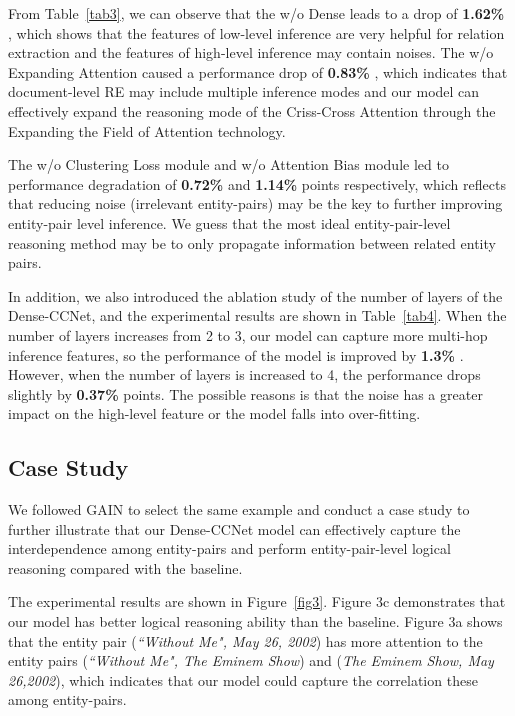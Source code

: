 \documentclass[11pt]{article}
\begin{document}
From Table~\ref{tab3}, we can observe that the w/o Dense leads to a drop of \textbf{1.62\%} , which shows that the features of low-level inference are very helpful for relation extraction and  the features of high-level inference may contain noises. 
The w/o Expanding Attention caused a performance drop of \textbf{0.83\%} , which indicates that document-level RE may include multiple inference modes and our model can effectively expand the reasoning mode of the Criss-Cross Attention through the Expanding the Field of Attention technology.

The w/o Clustering Loss module and w/o Attention Bias module led to performance degradation of \textbf{0.72\%}  and \textbf{1.14\%}  points respectively, which reflects that reducing noise (irrelevant entity-pairs) may be the key to further improving entity-pair level inference. 
We guess that the most ideal entity-pair-level reasoning method may be to only propagate information between related entity pairs.

In addition, we also introduced the ablation study of the number of layers of the Dense-CCNet, and the experimental results are shown in Table~\ref{tab4}.
When the number of layers increases from 2 to 3, our model can capture more multi-hop inference features, so the performance of the model is improved by \textbf{1.3\%} .
However, when the number of layers is increased to 4, the performance drops slightly by \textbf{0.37\%}  points.
The possible reasons is that the noise has a greater impact on the high-level feature or the model falls into over-fitting.























\subsection{Case Study}
We followed GAIN \cite{c:105} to select the same example and conduct a case study to further illustrate that our Dense-CCNet model can effectively capture the interdependence among entity-pairs and perform entity-pair-level logical reasoning compared with the baseline.

The experimental results are shown in Figure~\ref{fig3}. Figure 3c demonstrates that our model has better logical reasoning ability than the baseline.
Figure 3a shows that the entity pair (\textit{``Without Me", May 26, 2002}) has more attention to the entity pairs (\textit{``Without Me", The Eminem Show}) and (\textit{The Eminem Show, May 26,2002}),  which indicates that our model could capture the correlation these among entity-pairs.
\end{document}
